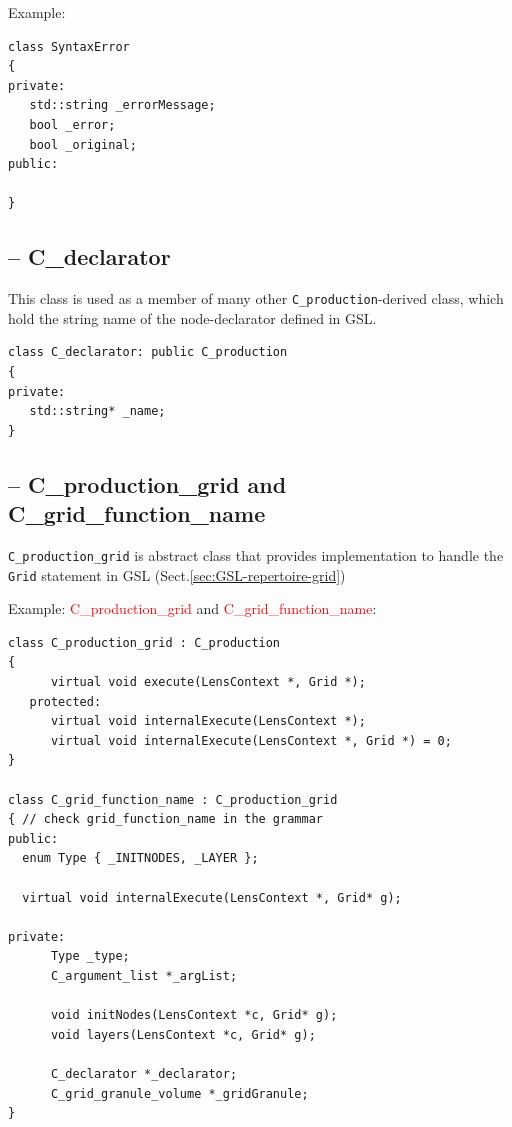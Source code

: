 Example:
\begin{verbatim}
class SyntaxError
{
private:
   std::string _errorMessage;
   bool _error;
   bool _original;
public:
   
}
\end{verbatim}

\subsection{-- C\_declarator}
\label{sec:C_declarator}

This class is used as a member of many other \verb!C_production!-derived class,
which hold the string name of the node-declarator defined in GSL.

\begin{verbatim}
class C_declarator: public C_production
{
private:
   std::string* _name;
}
\end{verbatim}

\subsection{-- C\_production\_grid and C\_grid\_function\_name}
\label{sec:C_production_grid}
\label{sec:C_grid_function_name}


\verb!C_production_grid! is abstract class that provides implementation to
handle the \verb!Grid! statement in GSL (Sect.\ref{sec:GSL-repertoire-grid})

Example: \textcolor{red}{C\_production\_grid} and
\textcolor{red}{C\_grid\_function\_name}: 
\begin{verbatim}
class C_production_grid : C_production
{
      virtual void execute(LensContext *, Grid *);
   protected:
      virtual void internalExecute(LensContext *);
      virtual void internalExecute(LensContext *, Grid *) = 0;
}

class C_grid_function_name : C_production_grid
{ // check grid_function_name in the grammar
public:
  enum Type { _INITNODES, _LAYER };
  
  virtual void internalExecute(LensContext *, Grid* g);
   
private:
      Type _type;
      C_argument_list *_argList;
      
      void initNodes(LensContext *c, Grid* g);
      void layers(LensContext *c, Grid* g);
      
      C_declarator *_declarator;
      C_grid_granule_volume *_gridGranule;
}
\end{verbatim}

